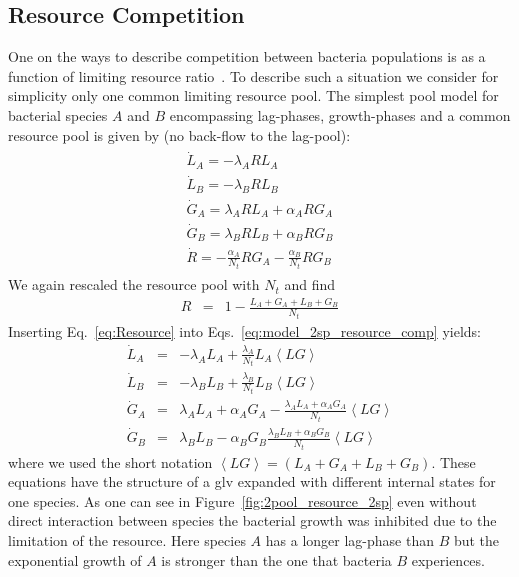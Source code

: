 \documentclass[10pt,A4paper]{article}
\numberwithin{equation}{section}
\begin{document}
\subsection{Resource Competition}
One on the ways to describe competition between bacteria populations is as a function of limiting resource ratio~\cite{tilman_resource_1977, smith_effects_2002}.
To describe such a situation we consider for simplicity only one common limiting resource pool.
The simplest pool model for bacterial species $A$ and $B$ encompassing lag-phases, growth-phases and a common resource pool is given by (no back-flow to the lag-pool):
\begin{align}
    \begin{split}
        \dot{L}_A = - \lambda_A R L_A\\
        \dot{L}_B = - \lambda_B R L_B \\
        \dot{G}_A = \lambda_A R L_A +\alpha_A R G_A\\
        \dot{G}_B = \lambda_B R L_B +\alpha_B R G_B\\
        \dot{R} =-\frac{\alpha_A}{N_t} R G_A-\frac{\alpha_B}{N_t} R G_B
    \end{split}
    \label{eq:model_2sp_resource_comp}
\end{align}
We again rescaled the resource pool with $N_t$ and find
\begin{eqnarray}
\label{eq:Resource}
R &=&1-\frac{L_A+G_A+L_B+G_B}{N_t}
\end{eqnarray}
Inserting Eq.~\ref{eq:Resource} into Eqs.~\ref{eq:model_2sp_resource_comp} yields:
\begin{eqnarray*}
    \dot{L}_A &=& - \lambda_A  L_A + \frac{\lambda_A}{N_t}L_A\left<LG\right>\\
    \dot{L}_B &=& - \lambda_B L_B + \frac{\lambda_B}{N_t}L_B \left<LG\right>\\
    \dot{G}_A &=&  \lambda_A  L_A + \alpha_A G_A - \frac{\lambda_A L_A + \alpha_A G_A}{N_t} \left<LG\right>\\
    \dot{G}_B &=&  \lambda_B L_B - \alpha_B G_B \frac{\lambda_B L_B + \alpha_B G_B}{N_t}\left<LG\right>
\end{eqnarray*}
where we used the short notation $\left<LG\right>=(L_A+G_A+L_B+G_B)$.
These equations have the structure of a \ac{glv} expanded with different internal states for one species.
As one can see in Figure~\ref{fig:2pool_resource_2sp} even without direct interaction between species the bacterial growth was inhibited due to the limitation of the resource.
Here species $A$ has a longer lag-phase than $B$ but the exponential growth of $A$ is stronger than the one that bacteria $B$ experiences.
\end{document}
